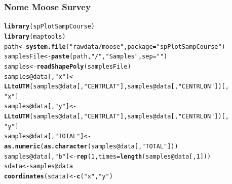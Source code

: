 \documentclass[mathserif,compress]{beamer}\usepackage{graphicx, color}
\makeatletter
\newcommand{\hlfunctioncall}[1]{\textcolor[rgb]{0.501960784313725,0,0.329411764705882}{\textbf{#1}}}%
\newcommand{\hlstring}[1]{\textcolor[rgb]{0.6,0.6,1}{#1}}%
\newenvironment{kframe}{%
 \def\at@end@of@kframe{}%
 \ifinner\ifhmode%
  \def\at@end@of@kframe{\end{minipage}}%
  \begin{minipage}{\columnwidth}%
 \fi\fi%
 \def\FrameCommand##1{\hskip\@totalleftmargin \hskip-\fboxsep
 \colorbox{shadecolor}{##1}\hskip-\fboxsep
     \hskip-\linewidth \hskip-\@totalleftmargin \hskip\columnwidth}%
 \MakeFramed {\advance\hsize-\width
   \@totalleftmargin\z@ \linewidth\hsize
   \@setminipage}}%
 {\par\unskip\endMakeFramed%
 \at@end@of@kframe}
\newenvironment{knitrout}{}{} %
\makeatother
\begin{document}

\begin{frame}[fragile]
\frametitle{Nome Moose Survey}

\begin{knitrout}\tiny
{}\color{fgcolor}\begin{kframe}
\begin{alltt}
\hlfunctioncall{library}(spPlotSampCourse)
\hlfunctioncall{library}(maptools)
path <- \hlfunctioncall{system.file}(\hlstring{"rawdata/moose"}, package = \hlstring{"spPlotSampCourse"})
samplesFile <- \hlfunctioncall{paste}(path, \hlstring{"/"}, \hlstring{"Samples"}, sep = \hlstring{""})
samples <- \hlfunctioncall{readShapePoly}(samplesFile)
samples@data[, \hlstring{"x"}] <- \hlfunctioncall{LLtoUTM}(samples@data[, \hlstring{"CENTRLAT"}], samples@data[, \hlstring{"CENTRLON"}])[, 
    \hlstring{"x"}]
samples@data[, \hlstring{"y"}] <- \hlfunctioncall{LLtoUTM}(samples@data[, \hlstring{"CENTRLAT"}], samples@data[, \hlstring{"CENTRLON"}])[, 
    \hlstring{"y"}]
samples@data[, \hlstring{"TOTAL"}] <- \hlfunctioncall{as.numeric}(\hlfunctioncall{as.character}(samples@data[, \hlstring{"TOTAL"}]))
samples@data[, \hlstring{"b"}] <- \hlfunctioncall{rep}(1, times = \hlfunctioncall{length}(samples@data[, 1]))
sdata <- samples@data
\hlfunctioncall{coordinates}(sdata) <- \hlfunctioncall{c}(\hlstring{"x"}, \hlstring{"y"})
\end{alltt}
\end{kframe}
\end{knitrout}


\end{frame}

\end{document}
